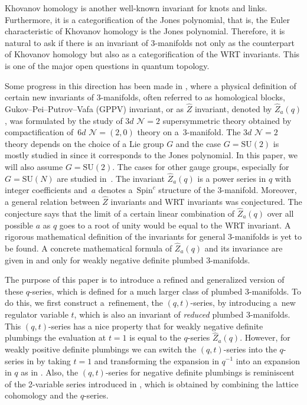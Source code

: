 \documentclass[pdftex]{sigma}
\numberwithin{equation}{section}
\begin{document}
Khovanov homology \cite{khovanov} is another well-known invariant for knots and links. Furthermore, it is a categorification of the Jones polynomial, that is, the Euler characteristic of Khovanov homology is the Jones polynomial. Therefore, it is natural to ask if there is an invariant of 3-manifolds not only as the counterpart of Khovanov homology but also as a categorification of the WRT invariants. This is one of the major open questions in quantum topology.

Some progress in this direction has been made in \cite{gppv, gpv}, where a physical definition of certain new invariants of 3-manifolds, often referred to as homological blocks, Gukov--Pei--Putrov--Vafa (GPPV) invariant, or as $\hat{Z}$ invariant, denoted by $ \hat{Z}_a(q) $, was formulated by the study of $3d$ $\mathcal{N}=2 $ supersymmetric theory obtained by compactification of~$6d$ $\mathcal{N}=(2,0)$ theory on a~3-mani\-fold. The $3d$ $\mathcal{N}=2 $ theory depends on the choice of a Lie group $ G $ and the case $G=\text{SU}(2)$ is mostly studied in \cite{gukov, gppv, gpv} since it corresponds to the Jones polynomial. In this paper, we will also assume $G=\text{SU}(2)$. The cases for other gauge groups, especially for $G=\text{SU}(N)$ are studied in~\cite{spark}. The invariant $ \hat{Z}_a(q) $ is a power series in $ q $ with integer coefficients and~$a$ denotes a~$ \text{Spin}^c $ structure of the 3-manifold. Moreover, a general relation between $ \hat{Z} $ invariants and WRT invariants was conjectured. The conjecture says that the limit of a certain linear combination of $ \hat{Z}_a(q) $ over all possible $ a $ as $ q $ goes to a root of unity would be equal to the WRT invariant. A rigorous mathematical definition of the invariants for general 3-manifolds is yet to be found. A concrete mathematical formula of $ \hat{Z}_a(q) $ and its invariance are given in \cite{gukov} and \cite{gppv} only for weakly negative definite plumbed 3-manifolds.

The purpose of this paper is to introduce a refined and generalized version of these $ q $-series, which is defined for a much larger class of plumbed 3-manifolds. To do this, we first construct a~refinement, the $ (q,t) $-series, by introducing a~new regulator variable $ t $, which is also an invariant of \textit{reduced} plumbed 3-manifolds. This $ (q,t) $-series has a nice property that for weakly negative definite plumbings the evaluation at $ t=1 $ is equal to the $ q $-series $ \hat{Z}_a(q) $. However, for weakly positive definite plumbings we can switch the $ (q,t) $-series into the $ q $-series in \cite{gukov} by taking $t=1$ and transforming the expansion in $ q^{-1} $ into an expansion in $ q $ as in \cite{cheng}. Also, the $ (q,t) $-series for negative definite plumbings is reminiscent of the 2-variable series introduced in \cite{akhmechet}, which is obtained by combining the lattice cohomology and the $ q $-series.
\end{document}
